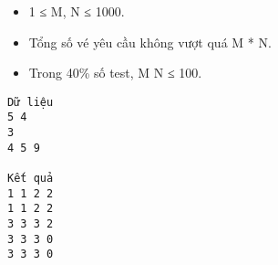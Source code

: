 \begin{itemize}
	\item     1 ≤ M, N ≤ 1000.   
	\item     Tổng số vé yêu cầu không vượt quá M * N.   
	\item     Trong 40\% số test, M N ≤ 100.   
\end{itemize}
\begin{verbatim}
Dữ liệu
5 4
3
4 5 9

Kết quả
1 1 2 2
1 1 2 2
3 3 3 2
3 3 3 0
3 3 3 0
\end{verbatim}